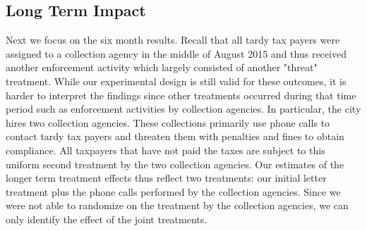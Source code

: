 \documentclass[12pt]{article}
\begin{document}
\subsection{Long Term Impact}

Next we focus on the six month results. Recall that all tardy tax
payers were assigned to a collection agency in the middle of August
2015 and thus received another enforcement activity which largely
consisted of another "threat" treatment.  While our experimental
design is still valid for these outcomes, it is harder to interpret
the findings since other treatments occurred during that time period
such as enforcement activities by collection agencies. In particular,
the city hires two collection agencies. These collections primarily
use phone calls to contact tardy tax payers and threaten them with
penalties and fines to obtain compliance. All taxpayers that have not
paid the taxes are subject to this uniform second treatment by the two
collection agencies.  Our estimates of the longer term treatment
effects thus reflect two treatments: our initial letter treatment plus
the phone calls performed by the collection agencies. Since we were
not able to randomize on the treatment by the collection agencies, we
can only identify the effect of the joint treatments.
\end{document}
